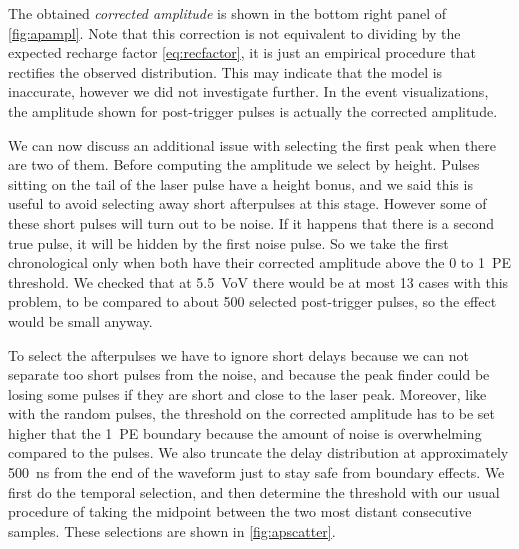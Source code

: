 \begin{figure}
    

    
    
\end{figure}

The obtained \emph{corrected amplitude} is shown in the bottom right panel of
\autoref{fig:apampl}. Note that this correction is not equivalent to dividing
by the expected recharge factor \eqref{eq:recfactor}, it is just an empirical
procedure that rectifies the observed distribution. This may indicate that the
model is inaccurate, however we did not investigate further. In the event
visualizations, the amplitude shown for post-trigger pulses is actually the
corrected amplitude.

We can now discuss an additional issue with selecting the first peak when there
are two of them. Before computing the amplitude we select by height. Pulses
sitting on the tail of the laser pulse have a height bonus, and we said this is
useful to avoid selecting away short afterpulses at this stage. However some of
these short pulses will turn out to be noise. If it happens that there is a
second true pulse, it will be hidden by the first noise pulse. So we take the
first chronological only when both have their corrected amplitude above the 0
to 1~PE threshold. We checked that at \SI{5.5}{VoV} there would be at most 13
cases with this problem, to be compared to about 500 selected post-trigger
pulses, so the effect would be small anyway.

To select the afterpulses we have to ignore short delays because we can not
separate too short pulses from the noise, and because the peak finder could be
losing some pulses if they are short and close to the laser peak. Moreover,
like with the random pulses, the threshold on the corrected amplitude has to be
set higher that the 1~PE boundary because the amount of noise is overwhelming
compared to the pulses. We also truncate the delay distribution at
approximately \SI{500}{ns} from the end of the waveform just to stay safe from
boundary effects. We first do the temporal selection, and then determine the
threshold with our usual procedure of taking the midpoint between the two most
distant consecutive samples. These selections are shown in
\autoref{fig:apscatter}.

